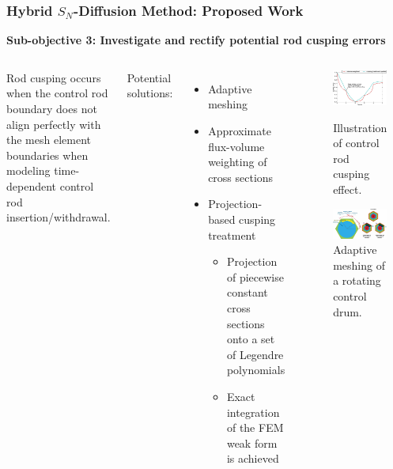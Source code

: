 \begin{frame}
  \frametitle{Hybrid $S_N$-Diffusion Method: Proposed Work}
  \textbf{Sub-objective 3: Investigate and rectify potential rod cusping errors}
  \vspace{.3cm}
  \begin{columns}
    \column[t]{6.5cm}
    Rod cusping occurs when the control rod boundary does not align perfectly with the mesh element
    boundaries when modeling time-dependent control rod insertion/withdrawal.
    \vspace{.1cm}
  
    Potential solutions:
    \begin{itemize}
      \item Adaptive meshing
      \item Approximate flux-volume weighting of cross sections
      \item Projection-based cusping treatment \cite{schunert_control_2019}
      \begin{itemize}
        \item Projection of piecewise constant cross sections onto a set of Legendre polynomials
        \item Exact integration of the FEM weak form is achieved
      \end{itemize}
    \end{itemize}
    \column[t]{5.5cm}
    \begin{figure}
      \centering
      \includegraphics[width=.65\columnwidth]{images/cusping}
      \caption{Illustration of control rod cusping effect.}
      \includegraphics[width=.65\columnwidth]{images/control-drum}
      \caption{Adaptive meshing of a rotating control drum.}
    \end{figure}
  \end{columns}
\end{frame}

